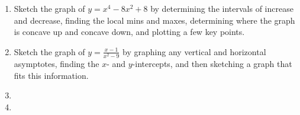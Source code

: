\begin{enumerate}
\item Sketch the graph of $y = x^4 - 8x^2 + 8$ by determining the intervals of increase and decrease, finding the local mins and maxes, determining where the graph is concave up and concave down, and plotting a few key points.


\item Sketch the graph of $y = \frac{x-1}{x^2-9}$ by graphing any vertical and horizontal asymptotes, finding the $x$- and $y$-intercepts, and then sketching a graph that fits this information.

\item 
\item 
\end{enumerate}
